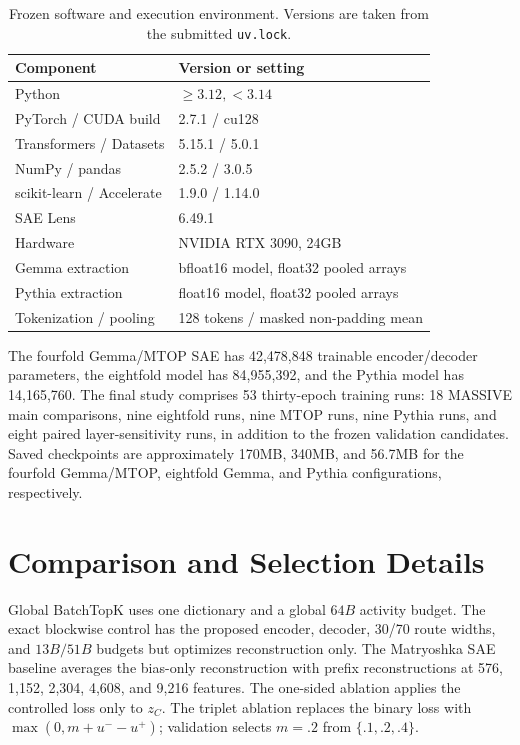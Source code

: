 \begin{table}[h]
\centering
\caption{Frozen software and execution environment. Versions are taken from the submitted \texttt{uv.lock}.}
\label{tab:software-compute}
\begin{tabular}{ll}
\toprule
Component & Version or setting \\
\midrule
Python & $\geq 3.12,<3.14$ \\
PyTorch / CUDA build & 2.7.1 / cu128 \\
Transformers / Datasets & 5.15.1 / 5.0.1 \\
NumPy / pandas & 2.5.2 / 3.0.5 \\
scikit-learn / Accelerate & 1.9.0 / 1.14.0 \\
SAE Lens & 6.49.1 \\
Hardware & NVIDIA RTX 3090, 24GB \\
Gemma extraction & bfloat16 model, float32 pooled arrays \\
Pythia extraction & float16 model, float32 pooled arrays \\
Tokenization / pooling & 128 tokens / masked non-padding mean \\
\bottomrule
\end{tabular}
\end{table}

The fourfold Gemma/MTOP SAE has 42,478,848 trainable encoder/decoder parameters, the eightfold model has 84,955,392, and the Pythia model has 14,165,760. The final study comprises 53 thirty-epoch training runs: 18 MASSIVE main comparisons, nine eightfold runs, nine MTOP runs, nine Pythia runs, and eight paired layer-sensitivity runs, in addition to the frozen validation candidates. Saved checkpoints are approximately 170MB, 340MB, and 56.7MB for the fourfold Gemma/MTOP, eightfold Gemma, and Pythia configurations, respectively.

\section{Comparison and Selection Details}

Global BatchTopK uses one dictionary and a global $64B$ activity budget. The exact blockwise control has the proposed encoder, decoder, 30/70 route widths, and $13B/51B$ budgets but optimizes reconstruction only. The Matryoshka SAE baseline \citep{kusupati2022matryoshka,karvonen2025saebench} averages the bias-only reconstruction with prefix reconstructions at 576, 1,152, 2,304, 4,608, and 9,216 features. The one-sided ablation applies the controlled loss only to $z_C$. The triplet ablation \citep{schroff2015facenet} replaces the binary loss with $\max(0,m+u^- -u^+)$; validation selects $m=.2$ from $\{.1,.2,.4\}$.

